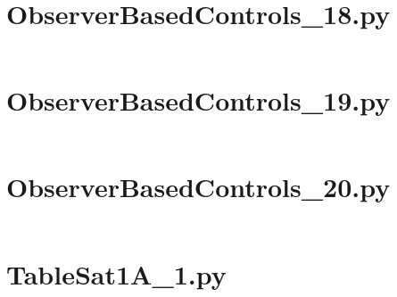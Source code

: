 \pagebreak
\section*{ObserverBasedControls\_18.py}\label{code:TSatPySamples/ObserverBasedControls_18.py}\inputminted[linenos,fontsize=\scriptsize]{python}{/home/dcouture/git/mathyourlife/TSatPy/tex/sample_scripts/ObserverBasedControls_18.py}

\pagebreak
\section*{ObserverBasedControls\_19.py}\label{code:TSatPySamples/ObserverBasedControls_19.py}\inputminted[linenos,fontsize=\scriptsize]{python}{/home/dcouture/git/mathyourlife/TSatPy/tex/sample_scripts/ObserverBasedControls_19.py}

\pagebreak
\section*{ObserverBasedControls\_20.py}\label{code:TSatPySamples/ObserverBasedControls_20.py}\inputminted[linenos,fontsize=\scriptsize]{python}{/home/dcouture/git/mathyourlife/TSatPy/tex/sample_scripts/ObserverBasedControls_20.py}

\pagebreak
\section*{TableSat1A\_1.py}\label{code:TSatPySamples/TableSat1A_1.py}\inputminted[linenos,fontsize=\scriptsize]{python}{/home/dcouture/git/mathyourlife/TSatPy/tex/sample_scripts/TableSat1A_1.py}
